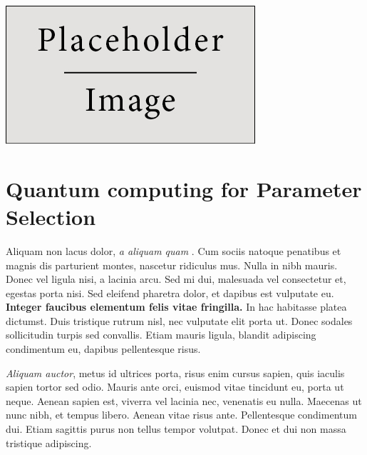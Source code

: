 \documentclass[a0,portrait]{a0poster}
\begin{document}
\begin{multicols}{2}
\begin{center}\vspace{1cm}
\includegraphics[width=0.8\linewidth]{placeholder}
\end{center}\vspace{1cm}

\section*{Quantum computing for Parameter Selection}
Aliquam non lacus dolor, \textit{a aliquam quam} \cite{Smith:2012qr}. Cum sociis natoque penatibus et magnis dis parturient montes, nascetur ridiculus mus. Nulla in nibh mauris. Donec vel ligula nisi, a lacinia arcu. Sed mi dui, malesuada vel consectetur et, egestas porta nisi. Sed eleifend pharetra dolor, et dapibus est vulputate eu. \textbf{Integer faucibus elementum felis vitae fringilla.} In hac habitasse platea dictumst. Duis tristique rutrum nisl, nec vulputate elit porta ut. Donec sodales sollicitudin turpis sed convallis. Etiam mauris ligula, blandit adipiscing condimentum eu, dapibus pellentesque risus.

\textit{Aliquam auctor}, metus id ultrices porta, risus enim cursus sapien, quis iaculis sapien tortor sed odio. Mauris ante orci, euismod vitae tincidunt eu, porta ut neque. Aenean sapien est, viverra vel lacinia nec, venenatis eu nulla. Maecenas ut nunc nibh, et tempus libero. Aenean vitae risus ante. Pellentesque condimentum dui. Etiam sagittis purus non tellus tempor volutpat. Donec et dui non massa tristique adipiscing.
\color{SaddleBrown} %

\end{multicols}
\end{document}
